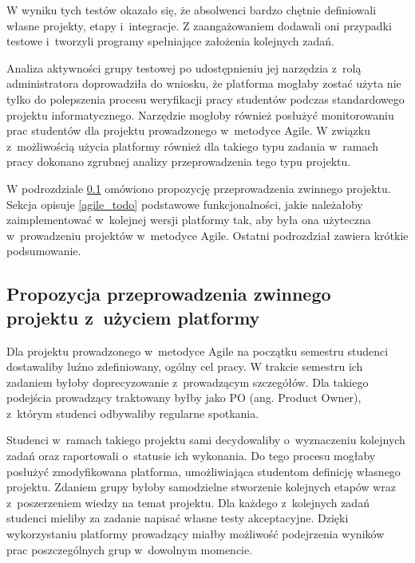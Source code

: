 W wyniku tych testów okazało się, że absolwenci bardzo chętnie definiowali własne projekty, etapy i~integracje.
Z zaangażowaniem dodawali oni przypadki testowe i~tworzyli programy spełniające założenia kolejnych zadań.

Analiza aktywności grupy testowej po udostępnieniu jej narzędzia z~rolą administratora doprowadziła do wniosku, że platforma mogłaby zostać użyta nie tylko do polepszenia procesu weryfikacji pracy studentów podczas standardowego projektu informatycznego.
Narzędzie mogłoby również posłużyć monitorowaniu prac studentów dla projektu prowadzonego w~metodyce Agile.
W związku z~możliwością użycia platformy również dla takiego typu zadania w~ramach pracy dokonano zgrubnej analizy przeprowadzenia tego typu projektu.

W podrozdziale \ref{agile_proposition} omówiono propozycję przeprowadzenia zwinnego projektu.
Sekcja opisuje \ref{agile_todo} podstawowe funkcjonalności, jakie należałoby zaimplementować w~kolejnej wersji platformy tak, aby była ona użyteczna w~prowadzeniu projektów w~metodyce Agile.
Ostatni podrozdział zawiera krótkie podsumowanie.

\subsection{Propozycja przeprowadzenia zwinnego projektu z~użyciem platformy}
\label{agile_proposition}

Dla projektu prowadzonego w~metodyce Agile na początku semestru studenci dostawaliby luźno zdefiniowany, ogólny cel pracy.
W trakcie semestru ich zadaniem byłoby doprecyzowanie z~prowadzącym szczegółów.
Dla takiego podejścia prowadzący traktowany byłby jako PO (ang. Product Owner), z~którym studenci odbywaliby regularne spotkania.

Studenci w~ramach takiego projektu sami decydowaliby o~wyznaczeniu kolejnych zadań oraz raportowali o~statusie ich wykonania.
Do tego procesu mogłaby posłużyć zmodyfikowana platforma, umożliwiająca studentom definicję własnego projektu.
Zdaniem grupy byłoby samodzielne stworzenie kolejnych etapów wraz z~poszerzeniem wiedzy na temat projektu.
Dla każdego z~kolejnych zadań studenci mieliby za zadanie napisać własne testy akceptacyjne.
Dzięki wykorzystaniu platformy prowadzący miałby możliwość podejrzenia wyników prac poszczególnych grup w~dowolnym momencie.

